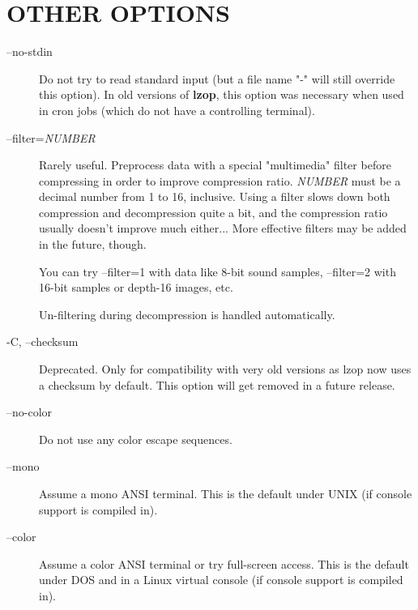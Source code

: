 \section{OTHER OPTIONS\label{OTHER_OPTIONS}}
\begin{description}

\item[--no-stdin] \mbox{}

Do not try to read standard input (but a file name "-" will
still override this option).
In old versions of \textbf{lzop}, this option was necessary when
used in cron jobs (which do not have a controlling terminal).


\item[--filter=\textit{NUMBER}] \mbox{}

Rarely useful.
Preprocess data with a special "multimedia" filter
before compressing in order to improve compression ratio.
\textit{NUMBER} must be a decimal number from 1 to 16, inclusive.
Using a filter slows down both compression and decompression
quite a bit, and the compression ratio usually doesn't improve
much either...
More effective filters may be added in the future, though.



You can try --filter=1 with data like 8-bit sound samples,
--filter=2 with 16-bit samples or depth-16 images, etc.



Un-filtering during decompression is handled automatically.


\item[-C, --checksum] \mbox{}

Deprecated. Only for compatibility with very old versions
as lzop now uses a checksum by default. This option will
get removed in a future release.


\item[--no-color] \mbox{}

Do not use any color escape sequences.


\item[--mono] \mbox{}

Assume a mono ANSI terminal. This is the default under UNIX
(if console support is compiled in).


\item[--color] \mbox{}

Assume a color ANSI terminal or try full-screen access. This
is the default under DOS and in a Linux virtual console
(if console support is compiled in).

\end{description}

